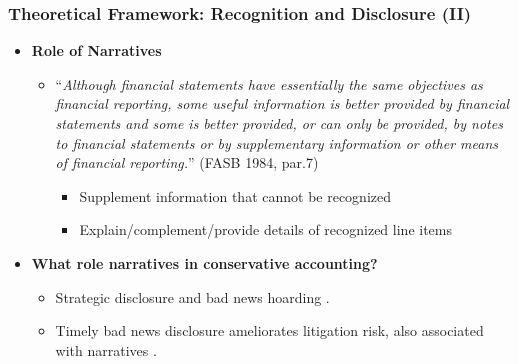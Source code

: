 \documentclass{beamer}
\begin{document}
\begin{frame}
\frametitle{Theoretical Framework: Recognition and Disclosure (II)}
\begin{itemize}
	
	\item \textbf{Role of Narratives} 
	
		\begin{itemize}
			\item
			``\textit{Although financial statements have essentially the same objectives as financial reporting, some useful information is better provided by financial statements and some is better provided, or can only be provided, by notes to financial statements or by supplementary information or other means of financial reporting.}'' (FASB 1984, par.7)


	\begin{itemize}
		\item Supplement information that cannot be recognized
		\item Explain/complement/provide details of recognized line items
	\end{itemize}
	\end{itemize}
\medskip
\pause

	\item \textbf{What role narratives in conservative accounting?} 

\begin{itemize}
	\item Strategic disclosure and bad news hoarding \citep[e.g.,][]{kothariManagersWithholdBad2009}.
	\item Timely bad news disclosure ameliorates litigation risk, also associated with narratives \citep[e.g.,][]{rogersDisclosureToneShareholder2011,skinnerWhyFirmsVoluntarily1994,skinnerEarningsDisclosuresStockholder1997}.
\end{itemize}




	
\end{itemize}
\end{frame}
\end{document}
